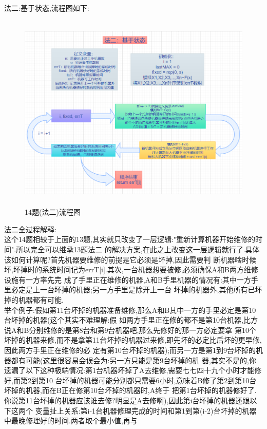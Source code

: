 \documentclass{book}
\begin{document}
\noindent
法二:基于状态,流程图如下: \\
\begin{figure}[H]
    \centering
    \includegraphics*[height = 9.5cm, width = 12cm]{gramFile/十四题/14题(法二)流程图.PNG}
    \caption{14题(法二)流程图}
\end{figure}
\noindent
法二全过程解释: \\
这个14题相较于上面的13题,其实就只改变了一层逻辑:"重新计算机器开始维修的时间".所以完全可以继承13题法二
的解决方案,在此之上改变这一层逻辑就行了.具体该如何计算呢?首先机器要维修的前提是它必须是坏掉,因此需要判
断机器啥时候坏,坏掉时的系统时间记为errT[i].其次,一台机器想要被修,必须确保A和B两方维修设施有一方率先完
成了手里正在维修的机器,A和B手里机器的情况有:其中一方手里必定是上一台坏掉的机器;另一方手里是除开上一台
坏掉的机器外,其他所有已坏掉的机器都有可能. \\
举个例子:假如第11台坏掉的机器准备维修,那么A和B其中一方的手里必定是第10台坏掉的机器(这个其实不难理解:假
如两方手里正在修的都不是第10台机器,比方说A和B分别维修的是第8台和第9台机器吧,那么先修好的那一方必定要拿
第10个坏掉的机器来修,而不是拿第11台坏掉的机器过来修,即先坏的必定比后坏的更早修,因此两方手里正在维修的必
定有第10台坏掉的机器);而另一方是第1到9台坏掉的机器都有可能(这里很容易会误会为:另一方只能是第9台坏掉的机
器,其实不是的,你遗漏了以下这种极端情况:第1台机器坏掉了A去维修,需要七七四十九个小时才能修好,而第2到第10
台坏掉的机器可能分别都只需要6小时,意味着B修了第2到第10台坏掉的机器,而在B正在修第10台坏掉的机器时,A终于
把第1台坏掉的机器修好了.你说第11台坏掉的机器应该谁去修?明显是A去修啊),因此第i台坏掉的机器还跟以下这两个
变量扯上关系:第i-1台机器修理完成的时间和第1到第(i-2)台坏掉的机器中最晚修理好的时间.两者取个最小值,再与
\end{document}
